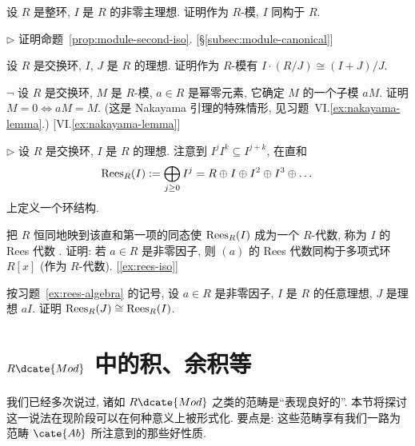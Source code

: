\begin{prob}
\label{ex:principal-free}
设 $R$ 是整环, $I$ 是 $R$ 的非零主理想. 证明作为 $R$-模, $I$ 同构于 $R$.
\end{prob}

\begin{prob}
\label{ex:prop-5-18}
$\triangleright$ 证明命题~\ref{prop:module-second-iso}. [\S\ref{subsec:module-canonical}]
\end{prob}

\begin{prob}
\label{ex:I-times-R-J}
设 $R$ 是交换环, $I$, $J$ 是 $R$ 的理想. 证明作为 $R$-模有 $I \cdot (R/J) \cong (I + J)/J$.
\end{prob}

\begin{prob}
\label{ex:nakayama-special}
$\neg$ 设 $R$ 是交换环, $M$ 是 $R$-模, $a \in R$ 是幂零元素, 它确定 $M$ 的一个子模 $aM$. 证明 $M = 0 \iff aM = M$. (这是 Nakayama 引理的特殊情形, 见习题~VI.\ref{ex:nakayama-lemma}.) [VI.\ref{ex:nakayama-lemma}]
\end{prob}

\begin{prob}
\label{ex:rees-algebra}
$\triangleright$ 设 $R$ 是交换环, $I$ 是 $R$ 的理想. 注意到 $I^j I^k \subseteq I^{j+k}$, 在直和
\[
\operatorname{Rees}_R(I) := \bigoplus_{j \geq 0} I^j = R \oplus I \oplus I^2 \oplus I^3 \oplus \dots
\]
上定义一个环结构.

把 $R$ 恒同地映到该直和第一项的同态使 $\operatorname{Rees}_R(I)$ 成为一个 $R$-代数, 称为 $I$ 的 Rees 代数%
. 证明: 若 $a \in R$ 是非零因子, 则 $(a)$ 的 Rees 代数同构于多项式环 $R[x]$ (作为 $R$-代数). [\ref{ex:rees-iso}]
\end{prob}

\begin{prob}
\label{ex:rees-iso}
按习题~\ref{ex:rees-algebra} 的记号, 设 $a \in R$ 是非零因子, $I$ 是 $R$ 的任意理想, $J$ 是理想 $aI$. 证明 $\operatorname{Rees}_R(J) \cong \operatorname{Rees}_R(I)$.
\end{prob}

\section{\texorpdfstring{$R\dcate{Mod}$}{R-Mod} 中的积、余积等}
\label{subsec:R-Mod-products}

我们已经多次说过, 诸如 $R\dcate{Mod}$ 之类的范畴是``表现良好的''. 本节将探讨这一说法在现阶段可以在何种意义上被形式化. 要点是: 这些范畴享有我们一路为范畴 $\cate{Ab}$ 所注意到的那些好性质.


